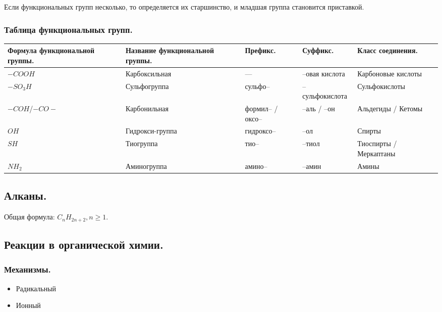 \documentclass[12pt]{article}
\begin{document}
	\begin{note}
		Если функциональных групп несколько, то определяется их старшинство, и младшая группа становится приставкой.
	\end{note}
	
	\subsubsection{Таблица функциональных групп.}
	
	\begin{xltabular}{\textwidth}{|X|X|X|X|X|}
		\hline
		Формула функциональной группы. & Название функциональной группы. & Префикс. & Суффикс. & Класс соединения.\\
		\hline
		$-COOH$ & Карбоксильная & --- & --овая кислота & Карбоновые кислоты\\
		\hline
		$-SO_3H$ & Сульфогруппа & сульфо-- & --сульфокислота & Сульфокислоты\\
		\hline
		$-COH$/$-CO-$ & Карбонильная & формил-- / оксо-- & --аль / --он & Альдегиды / Кетомы\\
		\hline
		$OH$ & Гидрокси-группа & гидроксо-- & --ол & Спирты\\
		\hline
		$SH$ & Тиогруппа & тио-- & --тиол & Тиоспирты / Меркаптаны\\
		\hline
		$NH_2$ & Аминогруппа & амино-- & --амин & Амины\\
		\hline
	\end{xltabular}
	
	\subsection{Алканы.}
	
	Общая формула: $C_nH_{2n + 2}, n \geqslant 1$.
	
	\subsection{Реакции в органической химии.}
	
	\subsubsection{Механизмы.}
	
	\begin{itemize}
		\item Радикальный
		\item Ионный
	\end{itemize}
	
\end{document}
